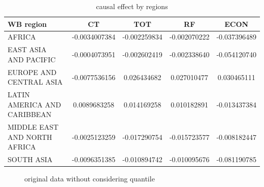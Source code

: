 \begin{table}[t]
	\begin{center}
		\begin{tabular}{l | c | c | c | c}
		\hline
			WB region 						& CT 			& TOT 			& RF 			& ECON \\ \hline
			AFRICA 							& -0.0034007384 	& -0.002259834  	& -0.002070222	& -0.037396489 \\ 
			EAST ASIA AND PACIFIC 			& -0.0004073951 	& -0.002602419	& -0.002338640 	& -0.054120740 \\ 
			EUROPE AND CENTRAL ASIA 		&-0.0077536156 	& 0.026434682		& 0.027010477 	& 0.030465111 	\\ 
			LATIN AMERICA AND CARIBBEAN		& 0.0089683258	& 0.014169258		& 0.010182891 	& -0.013437384 \\ 
			MIDDLE EAST AND NORTH AFRICA 	& -0.0025123259 	& -0.017290754	&-0.015723577 	& -0.008182447 \\ 
			SOUTH ASIA 						&-0.0096351385	& -0.010894742	& -0.010095676 	& -0.081190785 \\ \hline
		\end{tabular}
		\caption{causal effect by regions}\label{table:resbyregion}
	\end{center}
	
\end{table}



\begin{figure}
	\caption{original data without considering quantile}
\end{figure}



